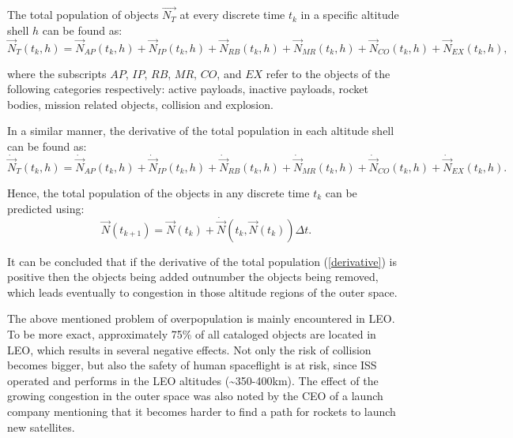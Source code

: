 The total population of objects $\vec{N_T}$ at every discrete time $t_k$ in a specific altitude shell $h$ can be found as:
\begin{equation} \label{total_population}
\vec{N}_T(t_k, h) = \vec{N}_{AP}(t_k, h) + \vec{N}_{IP}(t_k, h) + \vec{N}_{RB}(t_k, h) + \vec{N}_{MR}(t_k, h) + \vec{N}_{CO}(t_k, h) + \vec{N}_{EX}(t_k, h),
\end{equation}

where the subscripts $AP$, $IP$, $RB$, $MR$, $CO$, and $EX$ refer to the objects of the following categories respectively: active payloads, inactive payloads, rocket bodies, mission related objects, collision and explosion. \cite{Somma 2019}

\pagebreak
In a similar manner, the derivative of the total population in each altitude shell can be found as:
\begin{equation}\label{derivative}
\dot{\vec{N}}_T(t_k, h) = \dot{\vec{N}}_{AP}(t_k, h) + \dot{\vec{N}}_{IP}(t_k, h) + \dot{\vec{N}}_{RB}(t_k, h) + \dot{\vec{N}}_{MR}(t_k, h) + \dot{\vec{N}}_{CO}(t_k, h) + \dot{\vec{N}}_{EX}(t_k, h).
\end{equation}

Hence, the total population of the objects in any discrete time $t_k$ can be predicted using:
\begin{equation}\label{future}
\vec{N}(t_{k+1}) = \vec{N}(t_k) + \dot{\vec{N}}(t_k, \vec{N}(t_k))\Delta t.
\end{equation}

It can be concluded that if the derivative of the total population (\ref{derivative}) is positive then the objects being added outnumber the objects being removed, which leads eventually to congestion in those altitude regions of the outer space.

\bigskip
The above mentioned problem of overpopulation is mainly encountered in LEO. To be more exact, approximately 75\% of all cataloged objects are located in LEO, which results in several negative effects. Not only the risk of collision becomes bigger, but also the safety of human spaceflight is at risk, since ISS operated and performs in the LEO altitudes (\textasciitilde 350-400km). \cite{Kramer 2002} The effect of the growing congestion in the outer space was also noted by the CEO of a launch company mentioning that it becomes harder to find a path for rockets to launch new satellites. \cite{crowded}


\bigskip
